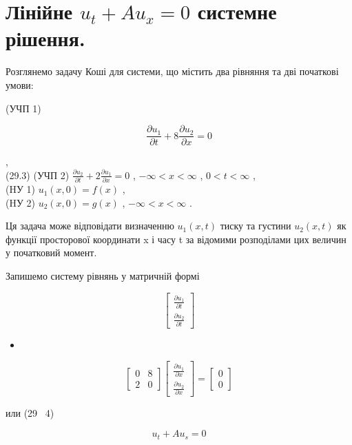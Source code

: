 \documentclass[
  ukrainian,
]{article}
\providecommand{\tightlist}{%
  \setlength{\itemsep}{0pt}\setlength{\parskip}{0pt}}
\begin{document}
\section{\texorpdfstring{Лінійне \(u_t + Au_x = 0\) системне
рішення.}{Лінійне u\_t + Au\_x = 0 системне рішення.}}\label{ux43bux456ux43dux456ux439ux43dux435-u_t-au_x-0-ux441ux438ux441ux442ux435ux43cux43dux435-ux440ux456ux448ux435ux43dux43dux44f.}

Розглянемо задачу Коші для системи, що містить два рівняння та дві
початкові умови:

(УЧП 1)

\[
\frac{\partial u_1}{\partial t} + 8 \frac{\partial u_2}{\partial x} = 0
\]

,\\
(29.3) (УЧП 2)
\(\frac{\partial u_2}{\partial t} + 2 \frac{\partial u_1}{\partial x} = 0\)
, \(-\infty < x < \infty\) , \(0 < t < \infty\) ,\\
(HУ 1) \(u_1(x, 0) = f(x)\) ,\\
(HУ 2) \(u_2(x, 0) = g(x)\) , \(-\infty < x < \infty\) .

Ця задача може відповідати визначенню \(u_1(x, t)\) тиску та густини
\(u_2(x, t)\) як функції просторової координати x і часу t за відомими
розподілами цих величин у початковий момент.

Запишемо систему рівнянь у матричній формі

\[
\begin{bmatrix} \frac{\partial u_1}{\partial t} \\ \frac{\partial u_2}{\partial t} \end{bmatrix}
\]

\begin{itemize}
\tightlist
\item
\end{itemize}

\[
\begin{bmatrix} 0 & 8 \\ 2 & 0 \end{bmatrix}
\begin{bmatrix} \frac{\partial u_1}{\partial x} \\ \frac{\partial u_2}{\partial x} \end{bmatrix}
=
\begin{bmatrix} 0 \\ 0 \end{bmatrix}
\]

или (29 ~4)

\[
u_t + Au_s = 0
\]
\end{document}
